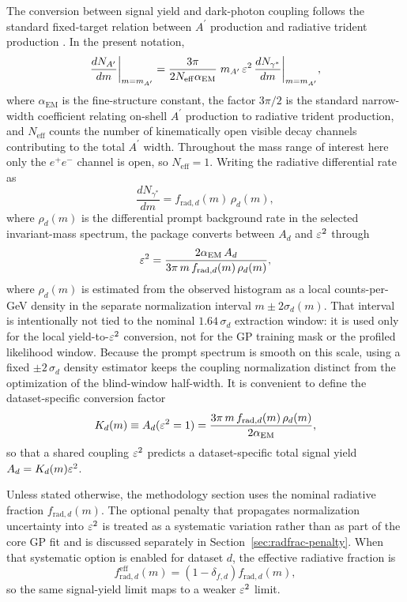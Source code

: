 The conversion between signal yield and dark-photon coupling follows the standard
fixed-target relation between $A^\prime$ production and radiative trident production
\cite{EssigEtAl2011,HPS2015DarkPhoton,HPS2016PromptLong}. In the present notation,
\begin{equation}
\frac{dN_{A^\prime}}{dm}\bigg|_{m=m_{A^\prime}}
= \frac{3\pi}{2N_{\mathrm{eff}}\alpha_{\mathrm{EM}}}
\; m_{A^\prime}\,\varepsilon^2\,
\frac{dN_{\gamma^\ast}}{dm}\bigg|_{m=m_{A^\prime}},
\end{equation}
where $\alpha_{\mathrm{EM}}$ is the fine-structure constant, the factor $3\pi/2$ is the
standard narrow-width coefficient relating on-shell $A^\prime$ production to radiative
trident production, and $N_{\mathrm{eff}}$ counts the number of kinematically open
visible decay channels contributing to the total $A^\prime$ width. Throughout the mass
range of interest here only the $e^+e^-$ channel is open, so $N_{\mathrm{eff}}=1$.
Writing the
radiative differential rate as
\begin{equation}
\frac{dN_{\gamma^\ast}}{dm}
= f_{\mathrm{rad},d}(m)\,\rho_d(m),
\end{equation}
where $\rho_d(m)$ is the differential prompt background rate in the selected
invariant-mass spectrum, the package converts between $A_d$ and $\varepsilon^2$ through
\begin{equation}
\varepsilon^2 =
\frac{2\alpha_{\mathrm{EM}}\,A_d}
{3\pi\,m\,f_{\mathrm{rad},d}(m)\,\rho_d(m)},
\label{eq:eps2-conversion}
\end{equation}
where $\rho_d(m)$ is estimated from the observed histogram as a local counts-per-GeV
density in the separate normalization interval $m\pm2\sigma_d(m)$. That interval is
intentionally not tied to the nominal $1.64\,\sigma_d$ extraction window: it is used
only for the local yield-to-$\varepsilon^2$ conversion, not for the GP training mask or the
profiled likelihood window. Because the prompt spectrum is smooth on this scale, using
a fixed $\pm2\,\sigma_d$ density estimator keeps the coupling normalization distinct
from the optimization of the blind-window half-width. It is convenient to define the
dataset-specific conversion factor
\begin{equation}
K_d(m) \equiv A_d(\varepsilon^2 = 1)
= \frac{3\pi\,m\,f_{\mathrm{rad},d}(m)\,\rho_d(m)}{2\alpha_{\mathrm{EM}}},
\end{equation}
so that a shared coupling $\varepsilon^2$ predicts a dataset-specific total signal yield
$A_d = K_d(m)\varepsilon^2$.

Unless stated otherwise, the methodology section uses the nominal radiative fraction
$f_{\mathrm{rad},d}(m)$. The optional penalty that propagates normalization uncertainty
into $\varepsilon^2$ is treated as a systematic variation rather than as part of the core GP
fit and is discussed separately in Section~\ref{sec:radfrac-penalty}. When that
systematic option is enabled for dataset $d$, the effective radiative fraction is
\begin{equation}
f_{\mathrm{rad},d}^{\mathrm{eff}}(m)
= \left(1-\delta_{f,d}\right) f_{\mathrm{rad},d}(m),
\end{equation}
so the same signal-yield limit maps to a weaker $\varepsilon^2$ limit.

